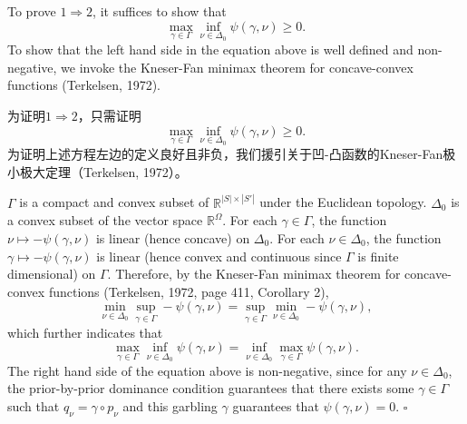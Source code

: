 \documentclass[12pt,a4paper]{article}
\newenvironment{original}
  {\par\vspace{4pt}\noindent\color{black}\ignorespaces}
  {\par\vspace{2pt}}
\newenvironment{translation}
  {\par\vspace{2pt}\noindent\color{myblue}\ignorespaces}
  {\par\vspace{6pt}}
\newcommand{\R}{\mathbb{R}}
\newcommand{\Delt}{\Delta}
\begin{document}
\begin{original}
To prove $1\Rightarrow 2$, it suffices to show that
\begin{equation}
    \max_{\gamma\in\Gamma}\inf_{\nu\in\Delt_0} \psi(\gamma,\nu) \geq 0.
\end{equation}
To show that the left hand side in the equation above is well defined and non-negative, we invoke the Kneser-Fan minimax theorem for concave-convex functions (Terkelsen, 1972).
\end{original}

\begin{translation}
为证明$1\Rightarrow 2$，只需证明
\begin{equation}
    \max_{\gamma\in\Gamma}\inf_{\nu\in\Delt_0} \psi(\gamma,\nu) \geq 0.
\end{equation}
为证明上述方程左边的定义良好且非负，我们援引关于凹-凸函数的Kneser-Fan极小极大定理（Terkelsen, 1972）。
\end{translation}

\begin{original}
$\Gamma$ is a compact and convex subset of $\R^{|S|\times|S'|}$ under the Euclidean topology. $\Delt_0$ is a convex subset of the vector space $\R^{\Omega}$. For each $\gamma\in\Gamma$, the function $\nu\mapsto -\psi(\gamma,\nu)$ is linear (hence concave) on $\Delt_0$. For each $\nu\in\Delt_0$, the function $\gamma\mapsto -\psi(\gamma,\nu)$ is linear (hence convex and continuous since $\Gamma$ is finite dimensional) on $\Gamma$. Therefore, by the Kneser-Fan minimax theorem for concave-convex functions (Terkelsen, 1972, page 411, Corollary 2),
\begin{equation}
    \min_{\nu\in\Delt_0}\sup_{\gamma\in\Gamma} -\psi(\gamma,\nu) = \sup_{\gamma\in\Gamma}\min_{\nu\in\Delt_0} -\psi(\gamma,\nu),
\end{equation}
which further indicates that
\begin{equation}
    \max_{\gamma\in\Gamma}\inf_{\nu\in\Delt_0} \psi(\gamma,\nu) = \inf_{\nu\in\Delt_0}\max_{\gamma\in\Gamma} \psi(\gamma,\nu).
\end{equation}
The right hand side of the equation above is non-negative, since for any $\nu\in\Delt_0$, the prior-by-prior dominance condition guarantees that there exists some $\gamma\in\Gamma$ such that $q_{\nu}=\gamma\circ p_{\nu}$ and this garbling $\gamma$ guarantees that $\psi(\gamma,\nu)=0$. $\square$
\end{original}
\end{document}
